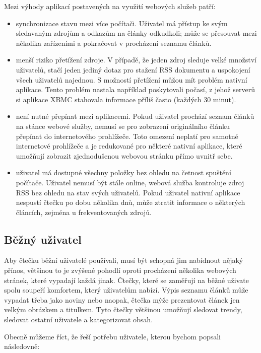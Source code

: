 Mezi výhody aplikací postavených na využití webových služeb patří:
\begin{itemize}
    \item synchronizace stavu mezi více počítači.
        Uživatel má přístup ke svým sledavaným zdrojům a odkazům na články odkudkoli; může se přesouvat mezi několika zařízeními a pokračovat v procházení seznamu článků.
    \item menší riziko přetížení zdroje.
        V případě, že jeden zdroj sleduje velké množství uživatelů, stačí jeden jediný dotaz pro stažení RSS dokumentu a uspokojení všech uživatelů najednou.
        S možností přetížení můžou mít problém nativní aplikace.
		Tento problém nastala například poskytovali počasí, z jehož serverů si aplikace XBMC stahovala informace příliš často (každých 30 minut).
    \item není nutné přepínat mezi aplikacemi.
        Pokud uživatel prochází seznam člán\-ků na stánce webové služby, nemusí se pro zobrazení originálního článku přepínat do internetového prohlížeče.
        Toto omezení neplatí pro samotné internetové prohlížeče a je redukované pro některé nativní aplikace, které umožňují zobrazit zjednodušenou webovou stránku přímo uvnitř sebe.
    \item uživatel má dostupné všechny položky bez ohledu na četnost spuštění počítače.
        Uživatel nemusí být stále online, webová služba kontroluje zdroj RSS bez ohledu na stav svých uživatelů.
        Pokud uživatel nativní aplikace nespustí čtečku po dobu několika dnů, může ztratit informace o některých článcích, zejména u frekventovaných zdrojů.
\end{itemize}

\subsection{Běžný uživatel}

Aby čtečku běžní uživatelé používali, musí být schopná jim nabídnout nějaký přínos, většinou to je zvýšené pohodlí oproti procházení několika webových stránek, které vypadají každá jinak.
Čtečky, které se zaměřují na běžné uživate spolu soupeří komfortem, který uživatelům nabízí.
Výpis seznamu článků může vypadat třeba jako noviny nebo naopak, čtečka mýže prezentovat článek jen velkým obrázkem a titulkem.
Tyto čtečky většinou umožňují sledovat trendy, sledovat ostatní uživatele a kategorizovat obsah.

Obecně můžeme říct, že řeší potřebu uživatele, kterou bychom popsali následovně:

